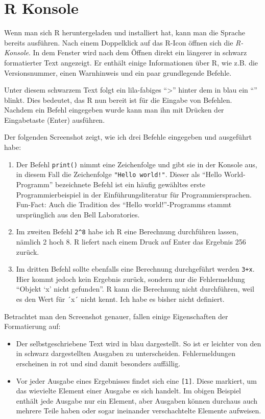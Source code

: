 \documentclass[
]{book}
\begin{document}
\hypertarget{konsole}{%
\section{R Konsole}\label{konsole}}

Wenn man sich R heruntergeladen und installiert hat, kann man die Sprache bereits ausführen.
Nach einem Doppelklick auf das R-Icon öffnen sich die \emph{R-Konsole}.
In dem Fenster wird nach dem Öffnen direkt ein längerer in schwarz formatierter Text angezeigt.
Er enthält einige Informationen über R, wie z.B. die Versionsnummer, einen Warnhinweis und ein paar grundlegende Befehle.

Unter diesem schwarzem Text folgt ein lila-fabiges ``\textgreater{}'' hinter dem in blau ein ``\textbar{}'' blinkt.
Dies bedeutet, das R nun bereit ist für die Eingabe von Befehlen. Nachdem ein Befehl eingegeben wurde kann man ihn mit Drücken der Eingabetaste (Enter) ausführen.

Der folgenden Screenshot zeigt, wie ich drei Befehle eingegeben und ausgeführt habe:

\begin{enumerate}
\def\labelenumi{\arabic{enumi}.}
\item
  Der Befehl \texttt{print()} nimmt eine Zeichenfolge und gibt sie in der Konsole aus, in diesem Fall die Zeichenfolge \texttt{"Hello\ world!"}.
  Dieser als ``Hello World-Programm'' bezeichnete Befehl ist ein häufig gewähltes erste Programmierbeispiel in der Einführungsliteratur für Programmiersprachen. Fun-Fact: Auch die Tradition des ``Hello world!''-Programms stammt ursprünglich aus den Bell Laboratories.
\item
  Im zweiten Befehl \texttt{2\^{}8} habe ich R eine Berechnung durchführen lassen, nämlich 2 hoch 8.
  R liefert nach einem Druck auf Enter das Ergebnis 256 zurück.
\item
  Im dritten Befehl sollte ebenfalls eine Berechnung durchgeführt werden \texttt{3+x}.
  Hier kommt jedoch kein Ergebnis zurück, sondern nur die Fehlermeldung ``Objekt `x' nicht gefunden''.
  R kann die Berechnung nicht durchführen, weil es den Wert für ´x´ nicht kennt.
  Ich habe es bisher nicht definiert.
\end{enumerate}

Betrachtet man den Screenshot genauer, fallen einige Eigenschaften der Formatierung auf:

\begin{itemize}
\item
  Der selbstgeschriebene Text wird in blau dargestellt. So ist er leichter von den in schwarz dargestellten Ausgaben zu unterscheiden. Fehlermeldungen erscheinen in rot und sind damit besonders auffällig.
\item
  Vor jeder Ausgabe eines Ergebnisses findet sich eine \texttt{{[}1{]}}. Diese markiert, um das wievielte Element einer Ausgabe es sich handelt.
  Im obigen Beispiel enthält jede Ausgabe nur ein Element, aber Ausgaben können durchaus auch mehrere Teile haben oder sogar ineinander verschachtelte Elemente aufweisen.
\end{itemize}
\end{document}
